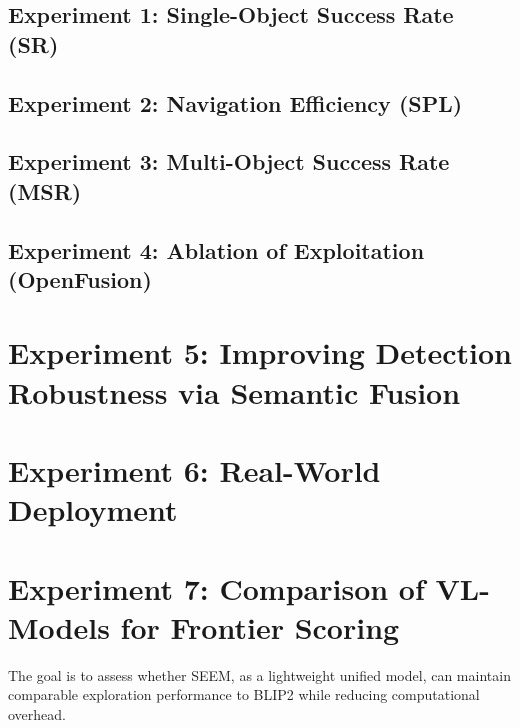 \subsection{Experiment 1: Single-Object Success Rate (SR)}

\subsection{Experiment 2: Navigation Efficiency (SPL)}

\subsection{Experiment 3: Multi-Object Success Rate (MSR)}

\subsection{Experiment 4: Ablation of Exploitation (OpenFusion)}

\section{Experiment 5: Improving Detection Robustness via Semantic Fusion}

\section{Experiment 6: Real-World Deployment}

\section{Experiment 7: Comparison of VL-Models for Frontier Scoring}
The goal is to assess whether SEEM, as a lightweight unified model, can maintain comparable exploration performance to BLIP2 while reducing computational overhead.